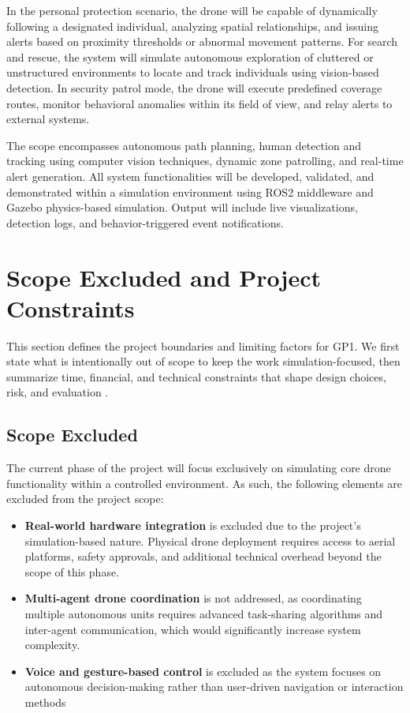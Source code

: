 \documentclass[12pt,a4paper]{report}
\begin{document}
In the personal protection scenario, the drone will be capable of dynamically following a designated individual, analyzing spatial relationships, and issuing alerts based on proximity thresholds or abnormal movement patterns. For search and rescue, the system will simulate autonomous exploration of cluttered or unstructured environments to locate and track individuals using vision-based detection. In security patrol mode, the drone will execute predefined coverage routes, monitor behavioral anomalies within its field of view, and relay alerts to external systems.

The scope encompasses autonomous path planning, human detection and tracking using computer vision techniques, dynamic zone patrolling, and real-time alert generation. All system functionalities will be developed, validated, and demonstrated within a simulation environment using \ac{ROS2} middleware and Gazebo physics-based simulation. Output will include live visualizations, detection logs, and behavior-triggered event notifications.

\section{Scope Excluded and Project Constraints}
\noindent
This section defines the project boundaries and limiting factors for GP1. We first state what is intentionally out of scope to keep the work simulation-focused, then summarize time, financial, and technical constraints that shape design choices, risk, and evaluation .


\subsection{Scope Excluded}
The current phase of the project will focus exclusively on simulating core drone functionality within a controlled environment. As such, the following elements are excluded from the project scope:
\begin{itemize}
    \item \textbf{Real-world hardware integration} is excluded due to the project's simulation-based nature. Physical drone deployment requires access to aerial platforms, safety approvals, and additional technical overhead beyond the scope of this phase.
    \item \textbf{Multi-agent drone coordination} is not addressed, as coordinating multiple autonomous units requires advanced task-sharing algorithms and inter-agent communication, which would significantly increase system complexity.
    \item \textbf{Voice and gesture-based control} is excluded as the system focuses on autonomous decision-making rather than user-driven navigation or interaction methods
\end{itemize}
\end{document}
